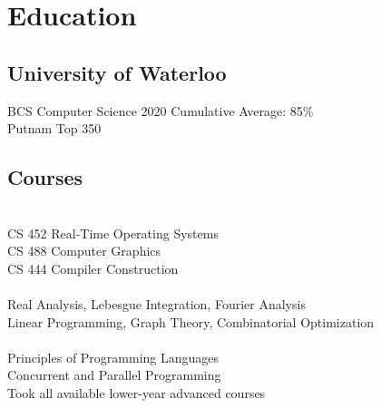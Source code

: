 \documentclass[]{deedy-resume-openfont}
\begin{document}
%
%

\setlength{\parindent}{0cm}


%
%

\begin{minipage}[t]{0.30\textwidth} 


\section{Education} 

\subsection{University of Waterloo}
BCS Computer Science 2020
\location{ }
Cumulative Average: 85\% \\
Putnam Top 350
\sectionsep

\subsection{Courses}
 \\
CS 452 Real-Time Operating Systems \\
CS 488 Computer Graphics \\
CS 444 Compiler Construction \\
\vspace{0.7em}
 \\
Real Analysis, Lebesgue Integration, Fourier Analysis \\
Linear Programming, Graph Theory, Combinatorial Optimization \\
\vspace{0.7em}
 \\
Principles of Programming Languages \\
Concurrent and Parallel Programming \\
Took all available lower-year advanced courses
\sectionsep



\end{minipage}
\end{document}
